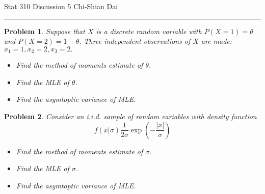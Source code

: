 \documentclass[12pt]{article}
\newtheorem{problem}{Problem}
\begin{document}
	\noindent Stat 310 \hfill  Discussion 5 \hfill Chi-Shian Dai
\smallskip
	\hrule
	\vspace*{2\baselineskip}

\begin{problem}

Suppose that $X$ is a discrete random variable with $P(X=1)=\theta$ and $P(X=2)=1-\theta$. Three independent observations of $X$ are made: $x_1=1,x_2=2,x_3=2.$
\begin{itemize}
	\item[a.] Find the method of moments estimate of $\theta$.
	\item [b.]Find the MLE of $\theta$.
	\item[c.] Find the asymtoptic variance of MLE.
\end{itemize}
	\end{problem}
\vspace*{8\baselineskip}
\begin{problem}
 

Consider an i.i.d. sample of random variables with density function 
$$f(x|\sigma)\frac{1}{2\sigma}\exp \left(-\frac{|x|}{\sigma}\right)$$
\begin{itemize}
	\item[a.] Find the method of moments estimate of $\sigma$.
	\item [b.]Find the MLE of $\sigma$.
	\item[c.] Find the asymtoptic variance of MLE.
\end{itemize}
\end{problem}
\end{document}
